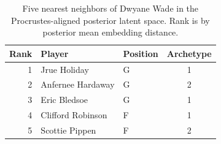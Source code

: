 \begin{table}[htbp]
  \centering\small
  \begin{tabular}{rllc}
    \toprule
    Rank & Player & Position & Archetype \\
    \midrule
    1 & Jrue Holiday & G & 1 \\
    2 & Anfernee Hardaway & G & 2 \\
    3 & Eric Bledsoe & G & 1 \\
    4 & Clifford Robinson & F & 1 \\
    5 & Scottie Pippen & F & 2 \\
    \bottomrule
  \end{tabular}
  \caption{Five nearest neighbors of Dwyane Wade in the Procrustes-aligned posterior latent space. Rank is by posterior mean embedding distance.}
  \label{tab:Dwyane_Wade_neighbors}
\end{table}


